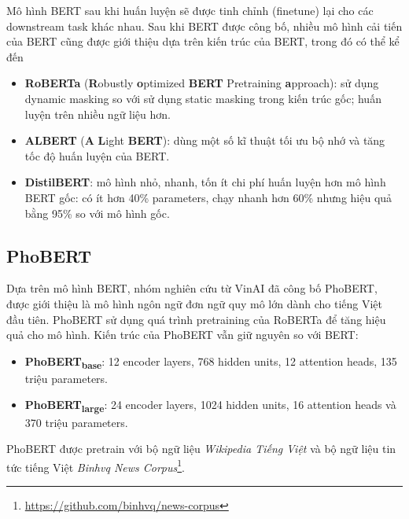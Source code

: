 Mô hình BERT sau khi huấn luyện sẽ được tinh chỉnh (finetune) lại cho các downstream task khác nhau. Sau khi BERT được công bố, nhiều mô hình cải tiến của BERT cũng được giới thiệu dựa trên kiến trúc của BERT, trong đó có thể kể đến

\begin{itemize}
\item \textbf{RoBERTa} (\textbf{R}obustly \textbf{o}ptimized \textbf{BERT} Pretraining \textbf{a}pproach)\cite{DBLP:journals/corr/abs-1907-11692}: sử dụng dynamic masking so với sử dụng static masking trong kiến trúc gốc; huấn luyện trên nhiều ngữ liệu hơn.
\item \textbf{ALBERT} (\textbf{A} \textbf{L}ight \textbf{BERT})\cite{https://doi.org/10.48550/arxiv.1909.11942}: dùng một số kĩ thuật tối ưu bộ nhớ và tăng tốc độ huấn luyện của BERT.
\item \textbf{DistilBERT}\cite{DBLP:journals/corr/abs-1910-01108}: mô hình nhỏ, nhanh, tốn ít chi phí huấn luyện hơn mô hình BERT gốc: có ít hơn 40\% parameters, chạy nhanh hơn 60\% nhưng hiệu quả bằng 95\% so với mô hình gốc.
\end{itemize}

\subsection{PhoBERT}
Dựa trên mô hình BERT, nhóm nghiên cứu từ VinAI đã công bố PhoBERT\cite{phobert}, được giới thiệu là mô hình ngôn ngữ đơn ngữ quy mô lớn dành cho tiếng Việt đầu tiên. PhoBERT sử dụng quá trình pretraining của RoBERTa để tăng hiệu quả cho mô hình. Kiến trúc của PhoBERT vẫn giữ nguyên so với BERT:
\begin{itemize}
\item \textbf{PhoBERT\textsubscript{base}}: 12 encoder layers, 768 hidden units, 12 attention heads, 135 triệu parameters.
\item \textbf{PhoBERT\textsubscript{large}}: 24 encoder layers, 1024 hidden units, 16 attention heads và 370 triệu parameters.
\end{itemize}
PhoBERT được pretrain với bộ ngữ liệu \textit{Wikipedia Tiếng Việt} và bộ ngữ liệu tin tức tiếng Việt \textit{Binhvq News Corpus}\footnote{\href{https://github.com/binhvq/news-corpus}{https://github.com/binhvq/news-corpus}}.

